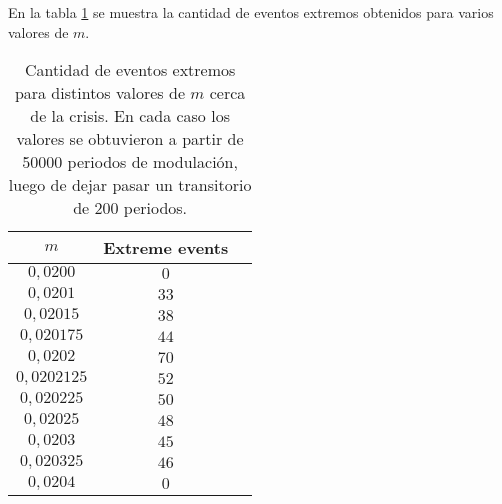 	En la tabla \ref{tab: extreme events} se muestra la cantidad de eventos extremos obtenidos para varios valores de $m$.
	
	\begin{center}
		\begin{table}[htp]
			\begin{tabular}{|c|c|c|}
				\hline
				$m$  		& 	       Extreme events \Ts \Bs         \\ \hline
				$0,0200$	&        		$0$  					  \\ \hline
				$0,0201$	&        		$33$					  \\ \hline
				$0,02015$	&        		$38$					  \\ \hline
				$0,020175$	&        		$44$					  \\ \hline
				$0,0202$	&        		$70$					  \\ \hline
				$0,0202125$	&        		$52$					  \\ \hline					  								  
				$0,020225$	&        		$50$					  \\ \hline					  								  
				$0,02025$	&        		$48$					  \\ \hline					 
				$0,0203$    &        		$45$					  \\ \hline
				$0,020325$  &        		$46$					  \\ \hline
				$0,0204$    &        		$0$				     	  \\ \hline
			\end{tabular}
			\caption{Cantidad de eventos extremos para distintos valores de $m$ cerca de la crisis. En cada caso los valores se obtuvieron a partir de 50000 periodos de modulación, luego de dejar pasar un transitorio de 200 periodos. }
			\label{tab: extreme events}
		\end{table}
	\end{center}
	
